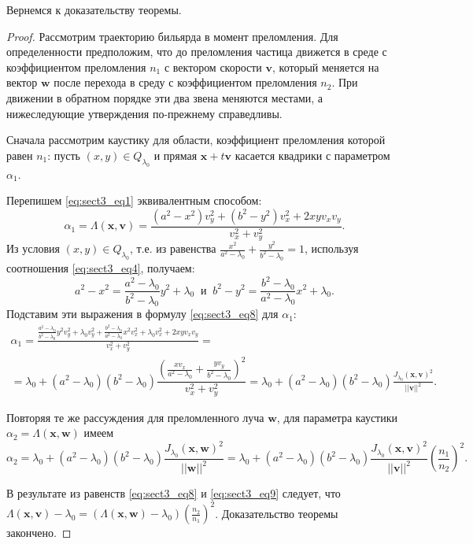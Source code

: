 Вернемся к доказательству теоремы.
\begin{proof}
Рассмотрим траекторию бильярда в момент преломления. Для определенности предположим, что  до преломления частица движется в среде с коэффициентом преломления $n_1$ с вектором скорости $\mathbf{v}$, который меняется на вектор $\mathbf{w}$ после перехода в среду с коэффициентом преломления $n_2$. При движении в обратном порядке эти два звена меняются местами, а нижеследующие утверждения по-прежнему справедливы.

Сначала рассмотрим каустику для области, коэффициент преломления которой равен $n_1$: пусть $(x,y) \in Q_{\lambda_0}$ и прямая $\mathbf{x}+t \mathbf{v}$ касается квадрики с параметром $\alpha_1$. 


Перепишем \eqref{eq:sect3_eq1} эквивалентным способом:
\begin{equation}
\alpha_1 = \Lambda(\mathbf{x}, \mathbf{v}) = \frac{(a^2-x^2) v_y^2 + (b^2-y^2)v_x^2 +2 x y v_x v_y}{v_x^2 + v_y^2}.
\label{eq:sect3_eq8}
\end{equation}
Из условия $(x,y) \in Q_{\lambda_0}$, т.е. из равенства $\frac{x^2}{a^2-\lambda_0} + \frac{y^2}{b^2-\lambda_0} =1$, используя соотношения \eqref{eq:sect3_eq4}, получаем:
$$a^2-x^2=\frac{a^2-\lambda_0}{b^2-\lambda_0}y^2+\lambda_0 \ \text{ и }\  b^2-y^2 = \frac{b^2-\lambda_0}{a^2-\lambda_0}x^2+\lambda_0.$$
Подставим эти выражения в формулу \eqref{eq:sect3_eq8} для $\alpha_1$:
\begin{multline*}
\alpha_1 = \frac{\frac{a^2-\lambda_0}{b^2-\lambda_0}y^2v_y^2 + \lambda_0 v_y^2 + \frac{b^2-\lambda_0}{a^2-\lambda_0}x^2v_x^2 + \lambda_0 v_x^2 + 2x y v_x v_y}{v_x^2+v_y^2} = \\
=\lambda_0 + (a^2-\lambda_0)(b^2-\lambda_0)\dfrac{(\frac{x v_x}{a^2-\lambda_0} + \frac{y v_y}{b^2-\lambda_0})^2}{v_x^2 + v_y^2} = 
\lambda_0 + (a^2-\lambda_0)(b^2-\lambda_0)\frac{J_{\lambda_0}(\mathbf{x}, \mathbf{v})^2}{||\mathbf{v}||^2}.
\end{multline*}

Повторяя те же рассуждения для преломленного луча $\mathbf{w}$, для параметра каустики $\alpha_2 = \Lambda(\mathbf{x}, \mathbf{w})$ имеем 
\begin{equation}
\alpha_2 = \lambda_0 + (a^2-\lambda_0)(b^2-\lambda_0)\frac{J_{\lambda_0}(\mathbf{x}, \mathbf{w})^2}{||\mathbf{w}||^2} = \lambda_0 + (a^2-\lambda_0)(b^2-\lambda_0)\frac{J_{\lambda_0}(\mathbf{x}, \mathbf{v})^2}{||\mathbf{v}||^2} \left(\frac{n_1}{n_2}\right)^2.
\label{eq:sect3_eq9}
\end{equation}

В результате из равенств \eqref{eq:sect3_eq8} и \eqref{eq:sect3_eq9} следует, что $\Lambda(\mathbf{x}, \mathbf{v}) - \lambda_0 = (\Lambda(\mathbf{x}, \mathbf{w}) - \lambda_0)\left(\frac{n_2}{n_1}\right)^2$. Доказательство теоремы закончено. 
\end{proof}

